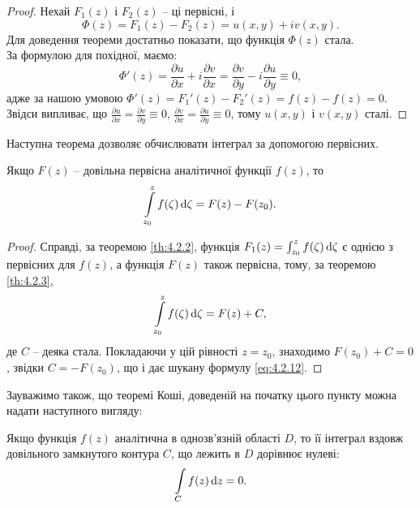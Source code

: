 \begin{proof}
Нехай $F_1(z)$ і $F_2(z)$ -- ці первісні, і
\begin{equation}
	\label{eq:4.2.10}
	\Phi(z) = F_1(z) - F_2(z) = u(x, y) + i v(x, y).
\end{equation}
Для доведення теореми достатньо показати, що функція $\Phi(z)$ стала. \\

За формулою для похідної, маємо:
\begin{equation}
	\label{eq:4.2.11}
	\Phi'(z) = \dfrac{\partial u}{\partial x} + i \dfrac{\partial v}{\partial x} = \dfrac{\partial v}{\partial y} - i \dfrac{\partial u}{\partial y} \equiv 0,
\end{equation}
адже за нашою умовою $\Phi'(z) = F_1'(z) - F_2'(z) = f(z) - f(z) = 0$. \\

Звідси випливає, що $\frac{\partial u}{\partial x} = \frac{\partial v}{\partial y} \equiv 0$, $\frac{\partial v}{\partial x} = \frac{\partial u}{\partial y} \equiv 0$, тому $u(x, y)$ і $v(x, y)$ сталі.
\end{proof}

Наступна теорема дозволяє обчислювати інтеграл за допомогою первісних.

\begin{theorem}
	\label{th:4.2.4}
	Якщо $F(z)$ -- довільна первісна аналітичної функції $f(z)$, то
	\begin{equation}
		\label{eq:4.2.12}
		\displaystyle\int\limits_{z_0}^z f(\zeta) \mathop{}\!\mathrm{d} \zeta = F(z) - F(z_0).
	\end{equation}
\end{theorem}

\begin{proof}
Справді, за теоремою \ref{th:4.2.2}, функція $F_1(z) = \int_{z_0}^z f(\zeta) \mathop{}\!\mathrm{d} \zeta$ є однією з первісних для $f(z)$, а функція $F(z)$ також первісна, тому, за теоремою \ref{th:4.2.3},
\begin{equation}
	\label{eq:4.2.13}
	\displaystyle\int\limits_{z_0}^z f(\zeta) \mathop{}\!\mathrm{d} \zeta = F(z) + C,
\end{equation}
де $C$ -- деяка стала. Покладаючи у цій рівності $z = z_0$, знаходимо $F(z_0) + C = 0$, звідки $C = - F(z_0)$, що і дає шукану формулу \eqref{eq:4.2.12}.
\end{proof}

Зауважимо також, що теоремі Коші, доведеній на початку цього пункту можна надати наступного вигляду:
\begin{theorem*}
Якщо функція $f(z)$ аналітична в однозв'язній області $D$, то її інтеграл вздовж довільного замкнутого контура $C$, що лежить в $D$ дорівнює нулеві:
	\begin{equation}
	\label{eq:4.2.14}
	\displaystyle\int\limits_C f(z) \mathop{}\!\mathrm{d} z = 0.
	\end{equation}
\end{theorem*}

